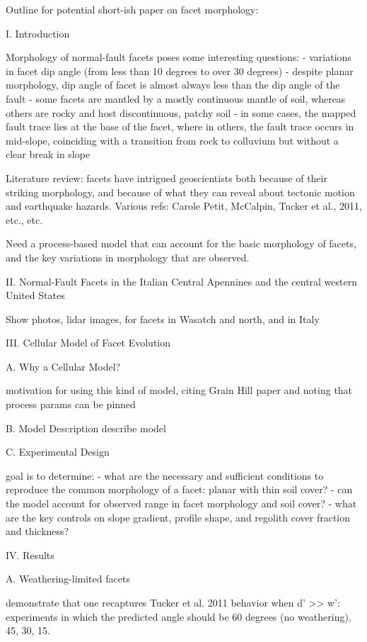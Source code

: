 Outline for potential short-ish paper on facet morphology:


I. Introduction

Morphology of normal-fault facets poses some interesting questions:
- variations in facet dip angle (from less than 10 degrees to over 30 degrees)
- despite planar morphology, dip angle of facet is almost always less than the dip angle of the fault
- some facets are mantled by a mostly continuous mantle of soil, whereas others are rocky and host discontinuous, patchy soil
- in some cases, the mapped fault trace lies at the base of the facet, where in others, the fault trace occurs in mid-slope, coinciding with a transition from rock to colluvium but without a clear break in slope

Literature review: facets have intrigued geoscientists both because of their striking morphology, and because of what they can reveal about tectonic motion and earthquake hazards. Various refs: Carole Petit, McCalpin, Tucker et al., 2011, etc., etc.

Need a process-based model that can account for the basic morphology of facets, and the key variations in morphology that are observed.


II. Normal-Fault Facets in the Italian Central Apennines and the central western United States

Show photos, lidar images, for facets in Wasatch and north, and in Italy


III. Cellular Model of Facet Evolution

A. Why a Cellular Model?

motivation for using this kind of model, citing Grain Hill paper and noting that process params can be pinned

B. Model Description
describe model

C. Experimental Design

goal is to determine:
- what are the necessary and sufficient conditions to reproduce the common morphology of a facet: planar with thin soil cover?
- can the model account for observed range in facet morphology and soil cover?
- what are the key controls on slope gradient, profile shape, and regolith cover fraction and thickness?


IV. Results

A. Weathering-limited facets

demonstrate that one recaptures Tucker et al. 2011 behavior when d' >> w': experiments in which the predicted angle should be 60 degrees (no weathering), 45, 30, 15.

